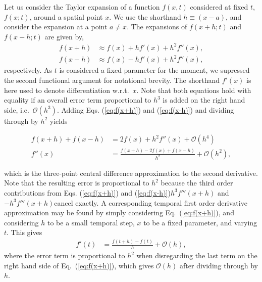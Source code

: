 \documentclass[a4paper, twocolumn]{article}
\newcommand{\eq} [1]{Eq.\ (\ref{eq:#1})}
\begin{document}
Let us consider the Taylor expansion of a function $f(x,t)$ considered at fixed $t$, $f(x;t)$, around a spatial point $x$. We use the shorthand $h\equiv (x-a)$, and consider the expansion at a point $a\not=x$. The expansions of $f(x+h;t)$ and $f(x-h;t)$ are given by, 
\begin{align}
f(x+h) &\approx f(x) + hf'(x) + h^2f''(x), \label{eq:f(x+h)}\\
f(x-h) &\approx f(x) - hf'(x) + h^2f''(x), \label{eq:f(x-h)}
\end{align}
respectively. As $t$ is considered a fixed parameter for the moment, we supressed the second functional argument for notational brevity. The shorthand $f'(x)$ is here used to denote differentiation w.r.t.\ $x$. Note that both equations hold with equality if an overall error term proportional to $h^3$ is added on the right hand side, i.e.\ $\mathcal{O}(h^3)$. Adding Eqs. (\ref{eq:f(x+h)}) and (\ref{eq:f(x-h)}) and dividing through by $h^2$ yields
\begin{strip}
\begin{align}
f(x+h)+f(x-h) &= 2f(x) + h^2f''(x) + \mathcal{O}(h^4) \nonumber \\
%
f''(x) &= \frac{f(x+h)-2f(x)+f(x-h)}{h^2} + \mathcal{O}(h^2), \label{eq:centraldiff}
\end{align}
\end{strip}
which is the three-point central difference approximation to the second derivative. Note that the resulting error is proportional to $h^2$ because the third order contributions from Eqs. (\ref{eq:f(x+h)}) and (\ref{eq:f(x-h)})\textemdash $h^3f'''(x+h)$ and $-h^3f'''(x+h)$\textemdash cancel exactly. A corresponding temporal first order derivative approximation may be found by simply considering \eq{f(x+h)}, and considering $h$ to be a small temporal step, $x$ to be a fixed parameter, and varying $t$. This gives
\begin{align}
f'(t)&= \frac{f(t+h)-f(t)}{h}+\mathcal{O}(h), \label{eq:forwarddiff}
\end{align}
where the error term is proportional to $h^2$ when disregarding the last term on the right hand side of \eq{f(x+h)}, which gives $\mathcal{O}(h)$ after dividing through by $h$.
\end{document}

